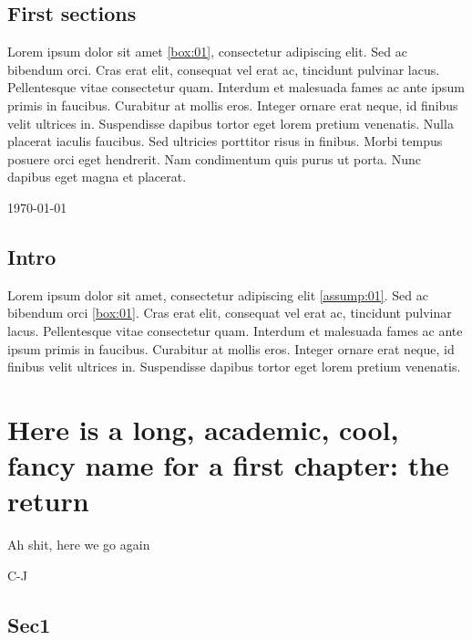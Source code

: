 \documentclass[11pt, a4paper]{report}
\begin{document}
\singlespacing

\section*{First sections}

\par Lorem ipsum dolor sit amet \ref{box:01}, consectetur adipiscing elit. Sed ac bibendum orci. Cras erat elit, consequat vel erat ac, tincidunt pulvinar lacus. Pellentesque vitae consectetur quam. Interdum et malesuada fames ac ante ipsum primis in faucibus. Curabitur at mollis eros. Integer ornare erat neque, id finibus velit ultrices in. Suspendisse dapibus tortor eget lorem pretium venenatis. Nulla placerat iaculis faucibus. Sed ultricies porttitor risus in finibus. Morbi tempus posuere orci eget hendrerit. Nam condimentum quis purus ut porta. Nunc dapibus eget magna et placerat.

\today
	
\clearpage	

\linenumbers %

\section*{Intro} \label{sec:intro}

\par Lorem ipsum dolor sit amet, consectetur adipiscing elit \ref{assump:01}. Sed ac bibendum orci \ref{box:01}. Cras erat elit, consequat vel erat ac, tincidunt pulvinar lacus. Pellentesque vitae consectetur quam. Interdum et malesuada fames ac ante ipsum primis in faucibus. Curabitur at mollis eros. Integer ornare erat neque, id finibus velit ultrices in. Suspendisse dapibus tortor eget lorem pretium venenatis. 

\chapter{Here is a long, academic, cool, fancy name for a first chapter: the return} \label{chap:1}

\epigraph{Ah shit, here we go again}{C-J}

\section{Sec1} \label{sec:intro}
\end{document}
